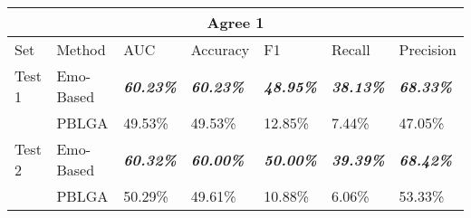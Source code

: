 \documentclass[12pt,a4paper]{report}
\theoremstyle{definition}
\begin{document}
\begin{CJK}{UTF8}{bsmi}
        
        
        
        
        \renewcommand{\arraystretch}{0.5}
        \begin{table}[H]
            \centering
            \begin{tabular}{l | | l | l | l | l | l | l}
                \hline
                \multicolumn{7}{c}{\textbf{Agree 1}} \\
                \hline
                Set & Method & AUC & Accuracy & F1 & Recall & Precision \\
                \hline \hline
                Test 1 & Emo-Based & \textit{\textbf{60.23\%}} & \textit{\textbf{60.23\%}} & \textit{\textbf{48.95\%}} & \textit{\textbf{38.13\%}} & \textit{\textbf{68.33\%}}\\
                 & PBLGA & 49.53\% & 49.53\% & 12.85\% & 7.44\% & 47.05\%\\
                
                \hline
                Test 2 & Emo-Based & \textit{\textbf{60.32\%}} & \textit{\textbf{60.00\%}} & \textit{\textbf{50.00\%}} & \textit{\textbf{39.39\%}} & \textit{\textbf{68.42\%}}\\
                 & PBLGA & 50.29\% & 49.61\% & 10.88\% & 6.06\% & 53.33\%\\
                

\end{tabular}
\end{table}
\end{CJK}
\end{document}
